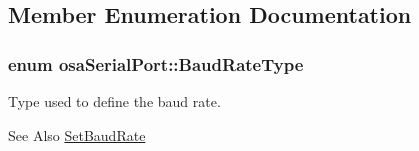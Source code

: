 \subsection{Member Enumeration Documentation}
\hypertarget{classosa_serial_port_a3fd8e997892088f924754f9cc11c78a4}{
\subsubsection[{Baud\-Rate\-Type}]{\setlength{\rightskip}{0pt plus 5cm}enum {\bf osa\-Serial\-Port\-::\-Baud\-Rate\-Type}}}\label{classosa_serial_port_a3fd8e997892088f924754f9cc11c78a4}
Type used to define the baud rate. \begin{DoxySeeAlso}{See Also}
\hyperlink{classosa_serial_port_a36b6562b689bcf2239d250e3d63a9ee8}{Set\-Baud\-Rate} 
\end{DoxySeeAlso}

